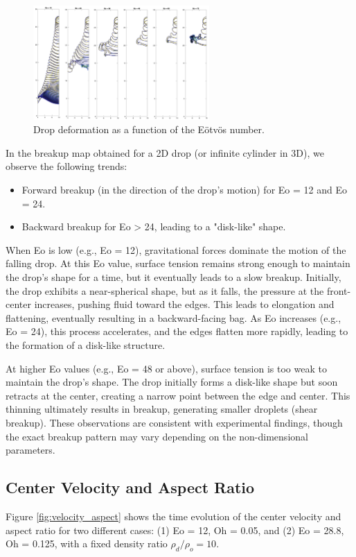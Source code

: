 \documentclass[12pt]{article}
\begin{document}
\begin{figure}[H]
    \centering
    \includegraphics[width=0.6\textwidth]{figures/Eo_effect.jpg}
    \caption{Drop deformation as a function of the Eötvös number.}
    \label{fig:deformation}
\end{figure}


In the breakup map obtained for a 2D drop (or infinite cylinder in 3D), we observe the following trends:

\begin{itemize}
    \item Forward breakup (in the direction of the drop's motion) for Eo = 12 and Eo = 24.
    \item Backward breakup for Eo > 24, leading to a "disk-like" shape.
\end{itemize}

When Eo is low (e.g., Eo = 12), gravitational forces dominate the motion of the falling drop. At this Eo value, surface tension remains strong enough to maintain the drop's shape for a time, but it eventually leads to a slow breakup. Initially, the drop exhibits a near-spherical shape, but as it falls, the pressure at the front-center increases, pushing fluid toward the edges. This leads to elongation and flattening, eventually resulting in a backward-facing bag. As Eo increases (e.g., Eo = 24), this process accelerates, and the edges flatten more rapidly, leading to the formation of a disk-like structure.

At higher Eo values (e.g., Eo = 48 or above), surface tension is too weak to maintain the drop's shape. The drop initially forms a disk-like shape but soon retracts at the center, creating a narrow point between the edge and center. This thinning ultimately results in breakup, generating smaller droplets (shear breakup). These observations are consistent with experimental findings, though the exact breakup pattern may vary depending on the non-dimensional parameters.



\subsection{Center Velocity and Aspect Ratio}
Figure \ref{fig:velocity_aspect} shows the time evolution of the center velocity and aspect ratio for two different cases: (1) Eo = 12, Oh = 0.05, and (2) Eo = 28.8, Oh = 0.125, with a fixed density ratio $\rho_d / \rho_o = 10$.
\end{document}
